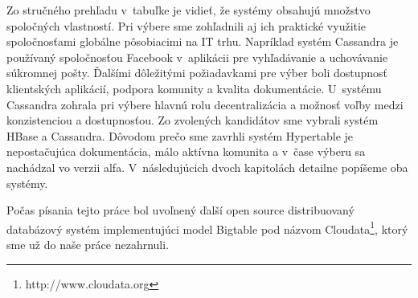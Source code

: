 \documentclass[11pt,twoside,a4paper]{book}
\begin{document}
Zo stručného prehľadu v~tabuľke je vidieť, že systémy obsahujú množstvo spoločných vlastností. Pri výbere sme zohľadnili aj ich praktické využitie spoločnosťami globálne pôsobiacimi na IT trhu. Napríklad systém Cassandra je používaný spoločnosťou Facebook v~aplikácii pre vyhľadávanie a uchovávanie súkromnej pošty. Ďalšími dôležitými požiadavkami pre výber boli dostupnosť klientských aplikácií, podpora komunity a kvalita dokumentácie. U~systému Cassandra zohrala pri výbere hlavnú rolu decentralizácia a možnosť voľby medzi konzistenciou a dostupnosťou. Zo zvolených kandidátov sme vybrali systém HBase a Cassandra. Dôvodom prečo sme zavrhli systém Hypertable je nepostačujúca dokumentácia, málo aktívna komunita a v~čase výberu sa nachádzal vo verzii alfa. V~následujúcich dvoch kapitolách detailne popíšeme oba systémy.

Počas písania tejto práce bol uvoľnený ďalší open source distribuovaný databázový systém implementujúci model Bigtable pod názvom Cloudata\footnote{http://www.cloudata.org}, ktorý sme už do naše práce nezahrnuli.
\end{document}
